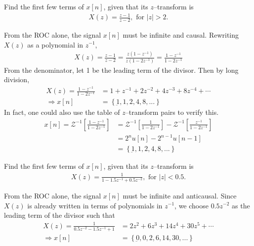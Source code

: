 \documentclass{report}
\begin{document}
\begin{example}
    Find the first few terms of $x[n]$, given that its $z$--transform is  
    \begin{align*}
        X(z) = \frac{z-1}{z-2}, \text{ for } |z|>2.
    \end{align*}
\end{example}
\begin{solution}
    From the ROC alone, the signal $x[n]$ must be infinite and causal. Rewriting $X(z)$ as a polynomial in $z^{-1}$,
    \begin{align*}
        X(z) = \frac{z-1}{z-2} = \frac{z(1-z^{-1})}{z(1-2z^{-1})} = \frac{1-z^{-1}}{1-2z^{-1}}
    \end{align*}
    From the denominator, let 1 be the leading term of the divisor. Then by long division,
    \begin{align*}
        X(z) = \frac{1-z^{-1}}{1-2z^{-1}} &= 1 + z^{-1} + 2z^{-2} + 4z^{-3} + 8z^{-4} + \cdots \\
        \Longrightarrow x[n] &= \left\{\underbar{1},1,2,4,8,...\right\}
    \end{align*}
    In fact, one could also use the table of $z$--transform pairs to verify this.
    \begin{align*}
        x[n] = \mathcal{Z}^{-1}\left[\frac{1-z^{-1}}{1-2z^{-1}}\right] &= \mathcal{Z}^{-1}\left[\frac{1}{1-2z^{-1}}\right] - \mathcal{Z}^{-1}\left[\frac{z^{-1}}{1-2z^{-1}}\right] \\
        &= 2^n u[n] - 2^{n-1}u[n-1] \\ 
        &= \left\{\underbar{1},1,2,4,8,...\right\}
    \end{align*}
\end{solution}

\begin{example}
    Find the first few terms of $x[n]$, given that its $z$--transform is  
    \begin{align*}
        X(z) = \frac{1}{1-1.5z^{-1}+0.5z^{-2}}, \text{ for } |z|<0.5.
    \end{align*}
\end{example}
\begin{solution}
    From the ROC alone, the signal $x[n]$ must be infinite and anticausal. Since $X(z)$ is already written in terms of polynomials in $z^{-1}$, 
    we choose $0.5z^{-2}$ as the leading term of the divisor such that 
    \begin{align*}
        X(z) = \frac{1}{0.5z^{-2}-1.5z^{-1}+1} &= 2z^2 + 6z^3 + 14z^4 + 30z^5 + \cdots \\
        \Longrightarrow x[n] &= \left\{\underbar{0},0,2,6,14,30,...\right\}
    \end{align*}
\end{solution}
\end{document}
